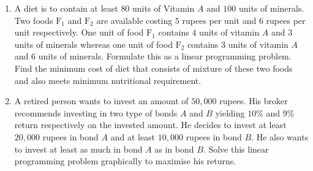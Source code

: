 \begin{enumerate}
	\item A diet is to contain at least $80$ units of Vitamin $A$ and $100$ units of minerals. 
Two foods $\text{F}_1$ and $\text{F}_2$ are available costing $5$ rupees per unit and $6$ rupees per unit respectively. 
One unit of food $\text{F}_1$ contains $4$ units of vitamin $A$ and $3$ units of minerals whereas
 one unit of food $\text{F}_2$ contains $3$ units of vitamin $A$ and $6$ units of minerals. 
 Formulate this as a linear programming problem. Find the minimum cost of diet that consists of mixture of these two foods and also meets minimum nutritional requirement.
 
 
 	\item  A retired person wants to invest an amount of $50,000$ rupees. His broker recommends investing in two type of bonds $A$ and $B$ yielding $10\%$ and $9\%$ return respectively on the invested amount. He decides to invest at least
$20,000$ rupees in bond $A$ and at least $10,000$ rupees in bond $B$. He also wants to invest at least as much in bond $A$ as in bond $B$. Solve this linear programming problem graphically to maximise his returns.


\end{enumerate}
